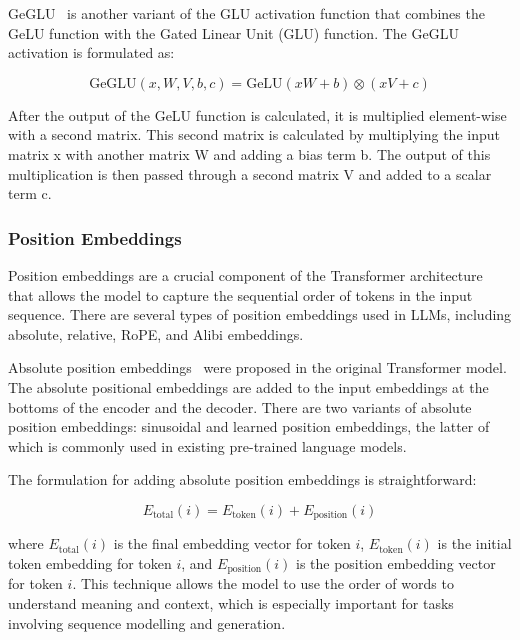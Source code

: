 GeGLU~\cite{shazeer2020glu} is another variant of the GLU activation function that combines the GeLU function with the Gated Linear Unit (GLU) function.
The GeGLU activation is formulated as:

\begin{equation}
	\text{GeGLU}\left(x, W, V, b, c\right) = \text{GeLU}\left(xW + b\right) \otimes \left(xV + c\right)
	\label{eq:geglu}
\end{equation}

\noindent After the output of the GeLU function is calculated, it is multiplied element-wise with a second matrix.
This second matrix is calculated by multiplying the input matrix x with another matrix W and adding a bias term b.
The output of this multiplication is then passed through a second matrix V and added to a scalar term c.

\subsubsection{Position Embeddings}
\label{subsubsec:position-embeddings}

Position embeddings are a crucial component of the Transformer architecture that allows the model to capture the sequential order of tokens in the input sequence.
There are several types of position embeddings used in LLMs, including absolute, relative, RoPE, and Alibi embeddings.

Absolute position embeddings~\cite{vaswani2023attention} were proposed in the original Transformer model.
The absolute positional embeddings are added to the input embeddings at the bottoms of the encoder and the decoder.
There are two variants of absolute position embeddings: sinusoidal and learned position embeddings, the latter of which is commonly used in existing pre-trained language models.

The formulation for adding absolute position embeddings is straightforward:

\begin{equation}
	E_{\text{total}}(i) = E_{\text{token}}(i) + E_{\text{position}}(i)
	\label{eq:absolute-position-embeddings}
\end{equation}

\noindent where \(E_{\text{total}}(i)\) is the final embedding vector for token \(i\), \(E_{\text{token}}(i)\) is the initial token embedding for token \(i\), and \(E_{\text{position}}(i)\) is the position embedding vector for token \(i\).
This technique allows the model to use the order of words to understand meaning and context, which is especially important for tasks involving sequence modelling and generation.

